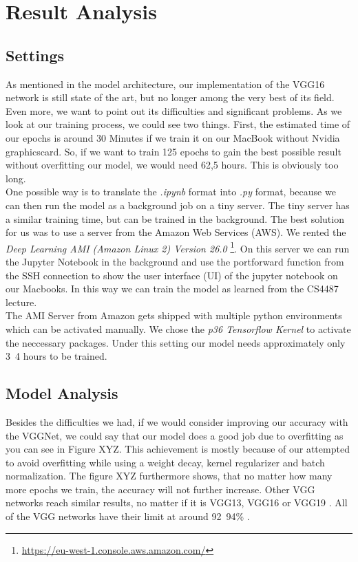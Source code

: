 \documentclass[journal]{IEEEtran}
\begin{document}
\section{Result Analysis}
\subsection{Settings}
As mentioned in the model architecture, our implementation of the VGG16 network is still state of the art, but no longer among the very best of its field. Even more, we want to point out its difficulties and significant problems. As we look at our training process, we could see two things. First, the estimated time of our epochs is around 30 Minutes if we train it on our MacBook without Nvidia graphicscard. So, if we want to train 125 epochs to gain the best possible result without overfitting our model, we would need 62,5 hours. This is obviously too long. \\ One possible way is to translate the \textit{.ipynb} format into \textit{.py} format, because we can then run the model as a background job on a tiny server. The tiny server has a similar training time, but can be trained in the background. 
The best solution for us was to use a server from the Amazon Web Services (AWS). We rented the \textit{Deep Learning AMI (Amazon Linux 2) Version 26.0} \footnote{\href{https://eu-west-1.console.aws.amazon.com/}{https://eu-west-1.console.aws.amazon.com/}}. On this server we can run the Jupyter Notebook in the background and use the portforward function from the SSH connection to show the user interface (UI) of the jupyter notebook on our Macbooks. In this way we can train the model as learned from the CS4487 lecture. \\
The AMI Server from Amazon gets shipped with multiple python environments which can be activated manually. We chose the \textit{p36 Tensorflow Kernel} to activate the neccessary packages.
Under this setting our model needs approximately only 3~4 hours to be trained. \\ 
\subsection{Model Analysis}
Besides the difficulties we had, if we would consider improving our accuracy with the VGGNet, we could say that our model does a good job due to overfitting as you can see in Figure XYZ. This achievement is mostly because of our attempted to avoid overfitting while using a weight decay, kernel regularizer and batch normalization. The figure XYZ furthermore shows, that no matter how many more epochs we train, the accuracy will not further increase. Other VGG networks reach similar results, no matter if it is VGG13, VGG16 or VGG19 \cite{RN16}. All of the VGG networks have their limit at around 92~94\% \cite{RN17}.

\ifCLASSOPTIONcaptionsoff
  \newpage
\fi


\vfill
\end{document}
